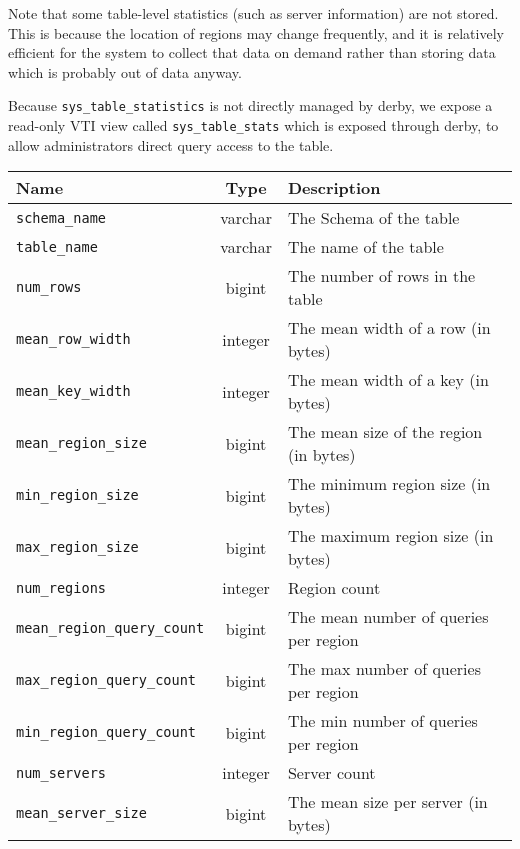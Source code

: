 Note that some table-level statistics (such as server information) are not stored. This is because the location of regions may change frequently, and it is relatively efficient for the system to collect that data on demand rather than storing data which is probably out of data anyway.

Because \texttt{sys\_table\_statistics} is not directly managed by derby, we expose a read-only VTI view called \texttt{sys\_table\_stats} which is exposed through derby, to allow administrators direct query access to the table.

\begin{table}
				\begin{tabular}{|l|c|p{6cm}|}
								\hline
								\bf{Name}														& \bf{Type}	&	\bf{Description} \\ \hline	
								\texttt{schema\_name}								&	varchar		&	The Schema of the table \\ \hline
								\texttt{table\_name}								&	varchar		&	The name of the table \\ \hline
								\texttt{num\_rows}									&	bigint		&	The number of rows in the table \\ \hline
								\texttt{mean\_row\_width}						&	integer		&	The mean width of a row (in bytes) 	\\ \hline
								\texttt{mean\_key\_width}						&	integer		&	The mean width of a key (in bytes) \\ \hline
								\texttt{mean\_region\_size}					&	bigint		&	The mean size of the region (in bytes) \\ \hline
								\texttt{min\_region\_size}					&	bigint		&	The minimum region size (in bytes) \\ \hline
								\texttt{max\_region\_size}					&	bigint		&	The maximum region size (in bytes) \\ \hline
								\texttt{num\_regions}								&	integer		&	Region count	\\	\hline
								\texttt{mean\_region\_query\_count}	&	bigint		&	The mean number of queries per region \\ \hline
								\texttt{max\_region\_query\_count}	&	bigint		&	The max number of queries per region \\ \hline
								\texttt{min\_region\_query\_count}	&	bigint		&	The min number of queries per region \\ \hline
								\texttt{num\_servers}								&	integer		&	Server count \\ \hline
								\texttt{mean\_server\_size}					&	bigint		&	The mean size per server (in bytes) \\ \hline

\end{tabular}
\end{table}
